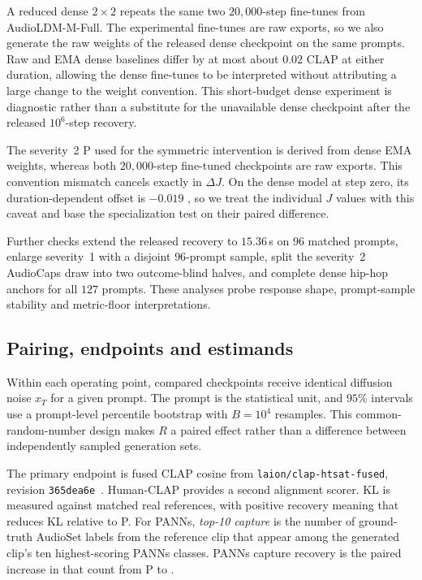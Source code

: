 A reduced dense $2\times2$ repeats the same two $20{,}000$-step fine-tunes from AudioLDM-M-Full. The experimental fine-tunes are raw exports, so we also generate the raw weights of the released dense checkpoint on the same prompts. Raw and EMA dense baselines differ by at most about $0.02$ CLAP at either duration, allowing the dense fine-tunes to be interpreted without attributing a large change to the weight convention. This short-budget dense experiment is diagnostic rather than a substitute for the unavailable dense checkpoint after the released $10^{6}$-step recovery.

The severity~2 P used for the symmetric intervention is derived from dense EMA weights, whereas both $20{,}000$-step fine-tuned checkpoints are raw exports. This convention mismatch cancels exactly in $\Delta J$. On the dense model at step zero, its duration-dependent offset is $-0.019$ , so we treat the individual $J$ values with this caveat and base the specialization test on their paired difference.

Further checks extend the released recovery to $15.36$\,s on $96$ matched prompts, enlarge severity~1 with a disjoint $96$-prompt sample, split the severity~2 AudioCaps draw into two outcome-blind halves, and complete dense hip-hop anchors for all $127$ prompts. These analyses probe response shape, prompt-sample stability and metric-floor interpretations.

\subsection{Pairing, endpoints and estimands}
Within each operating point, compared checkpoints receive identical diffusion noise $x_T$ for a given prompt. The prompt is the statistical unit, and $95\%$ intervals use a prompt-level percentile bootstrap with $B=10^{4}$ resamples. This common-random-number design makes $R$ a paired effect rather than a difference between independently sampled generation sets.

The primary endpoint is fused CLAP cosine from \texttt{laion/\allowbreak clap-htsat-fused}, revision \texttt{365dea6e}~\cite{wu2023clap}. Human-CLAP provides a second alignment scorer. KL is measured against matched real references, with positive recovery meaning that \PFT{} reduces KL relative to P. For PANNs, \emph{top-10 capture} is the number of ground-truth AudioSet labels from the reference clip that appear among the generated clip's ten highest-scoring PANNs classes. PANNs capture recovery is the paired increase in that count from P to \PFT{}.

